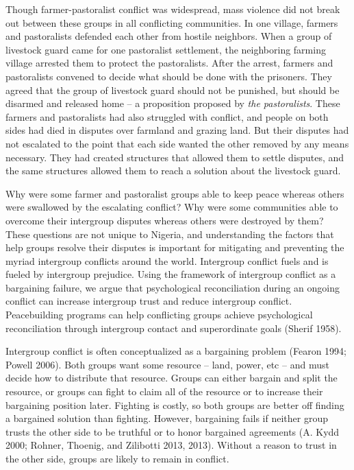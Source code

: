 \documentclass[11pt]{article}
\begin{document}
Though farmer-pastoralist conflict was widespread, mass violence did not
break out between these groups in all conflicting communities. In one
village, farmers and pastoralists defended each other from hostile
neighbors. When a group of livestock guard came for one pastoralist
settlement, the neighboring farming village arrested them to protect the
pastoralists. After the arrest, farmers and pastoralists convened to
decide what should be done with the prisoners. They agreed that the
group of livestock guard should not be punished, but should be disarmed
and released home -- a proposition proposed by \emph{the pastoralists}.
These farmers and pastoralists had also struggled with conflict, and
people on both sides had died in disputes over farmland and grazing
land. But their disputes had not escalated to the point that each side
wanted the other removed by any means necessary. They had created
structures that allowed them to settle disputes, and the same structures
allowed them to reach a solution about the livestock guard.

Why were some farmer and pastoralist groups able to keep peace whereas
others were swallowed by the escalating conflict? Why were some
communities able to overcome their intergroup disputes whereas others
were destroyed by them? These questions are not unique to Nigeria, and
understanding the factors that help groups resolve their disputes is
important for mitigating and preventing the myriad intergroup conflicts
around the world. Intergroup conflict fuels and is fueled by intergroup
prejudice. Using the framework of intergroup conflict as a bargaining
failure, we argue that psychological reconciliation during an ongoing
conflict can increase intergroup trust and reduce intergroup conflict.
Peacebuilding programs can help conflicting groups achieve psychological
reconciliation through intergroup contact and superordinate goals
(Sherif 1958).

Intergroup conflict is often conceptualized as a bargaining problem
(Fearon 1994; Powell 2006). Both groups want some resource -- land,
power, etc -- and must decide how to distribute that resource. Groups
can either bargain and split the resource, or groups can fight to claim
all of the resource or to increase their bargaining position later.
Fighting is costly, so both groups are better off finding a bargained
solution than fighting. However, bargaining fails if neither group
trusts the other side to be truthful or to honor bargained agreements
(A. Kydd 2000; Rohner, Thoenig, and Zilibotti 2013, 2013). Without a
reason to trust in the other side, groups are likely to remain in
conflict.
\end{document}
